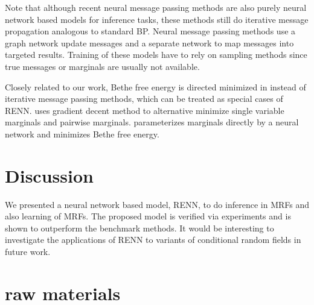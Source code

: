 Note that although recent neural message passing methods are also purely neural network based models for inference tasks, these methods still do iterative message propagation analogous to standard BP.
Neural message passing methods \cite{yoon2019inferenceGraph, pmlr-v70-gilmer17a} use a  graph network update messages and a separate network to map messages into targeted results. Training of these models have to rely on sampling methods since true messages or marginals are usually not available.

Closely related to our work, Bethe free energy is directed minimized in  \cite{welling2001belief,NIPS2019_9687} instead of iterative message passing methods, which can be treated as special cases of RENN. \cite{welling2001belief} uses gradient decent method to alternative minimize single variable marginals and pairwise marginals. \cite{NIPS2019_9687} parameterizes marginals directly by a neural network and minimizes Bethe free energy. 



\section{Discussion}
We presented a neural network based model, RENN, to do inference in MRFs and also learning of MRFs. The proposed model is verified via experiments and is shown to outperform the benchmark methods. It would be interesting to investigate the applications of RENN to variants of conditional random fields in future work.


\section{raw materials}
